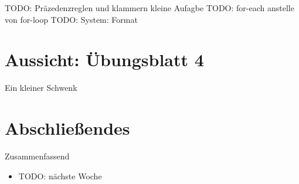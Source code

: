 \fi
\begin{frame}
    TODO: Präzedenzreglen und klammern kleine Aufagbe
    TODO: for-each anstelle von for-loop
    TODO: System: Format
\end{frame}
\section{Aussicht: Übungsblatt 4}
\begin{frame}{Ein kleiner Schwenk}
\end{frame}

\section{Abschließendes}
{\SummaryFrame
\begin{frame}[t]{Zusammenfassend}
\pause \printBibCommand
\vfill\vfill %
\begin{itemize}[<+(1)->]
    \itemsep11pt
    \item TODO: nächste Woche
\end{itemize}
\end{frame}
}

\outro{\vskip6mm\centering\begin{tikzpicture}[scale=1.85]
\end{tikzpicture}}


\iffull\fi
